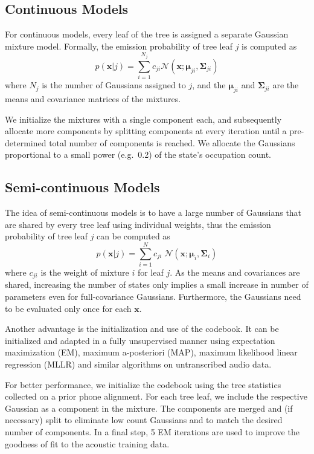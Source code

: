\documentclass{article}
\def \x{{\mathbf x}}
\def \m{{\bm \mu}}
\def \k{{\mathbf \Sigma}}
\def \nv{{\mathcal N}}
\begin{document}
\subsection{Continuous Models}
For continuous models, every leaf of the tree is assigned a separate
Gaussian mixture model. Formally, the emission probability of tree leaf $j$ is 
computed as
\begin{equation}
p(\x | j) = \sum_{i=1}^{N_j} c_{ji} \nv(\x; \m_{ji}, \k_{ji}) 
\end{equation}
where $N_j$ is the number of Gaussians assigned to $j$, and the $\m_{ji}$ and
$\k_{ji}$ are the means and covariance matrices of the mixtures.

We initialize the mixtures with a single component each, and subsequently 
allocate more components by splitting components at every iteration until a 
pre-determined total number of components is reached. We allocate 
the Gaussians proportional to a small power (e.g.~0.2) of the state's 
occupation count.

\subsection{Semi-continuous Models}
The idea of semi-continuous models is to have a large number of Gaussians that
are shared by every tree leaf using individual weights, thus the emission 
probability of tree leaf $j$ can be computed as
\begin{equation}
p(\x | j) = \sum_{i=1}^{N} c_{ji} \; \nv(\x; \m_i, \k_i) 
\end{equation}
where $c_{ji}$ is the weight of mixture $i$ for leaf $j$. As the means
and covariances are shared, increasing the number of states only implies
a small increase in number of parameters even for full-covariance Gaussians.
Furthermore, the Gaussians need to be evaluated only once for each $\x$.

Another advantage is the initialization and use of the codebook. It can be
initialized and adapted in a fully unsupervised manner using expectation
maximization (EM), maximum a-posteriori (MAP), maximum likelihood linear
regression (MLLR) and similar algorithms on untranscribed audio data.

For better performance, we initialize the codebook using the tree statistics
collected on a prior phone alignment. For each tree leaf, we include
the respective Gaussian as a component in the mixture.
The components are merged and (if necessary) split to eliminate low count 
Gaussians and to match the desired number of components. In a final step, 
5 EM iterations are used to improve the goodness of fit to the acoustic 
training data.
\end{document}
